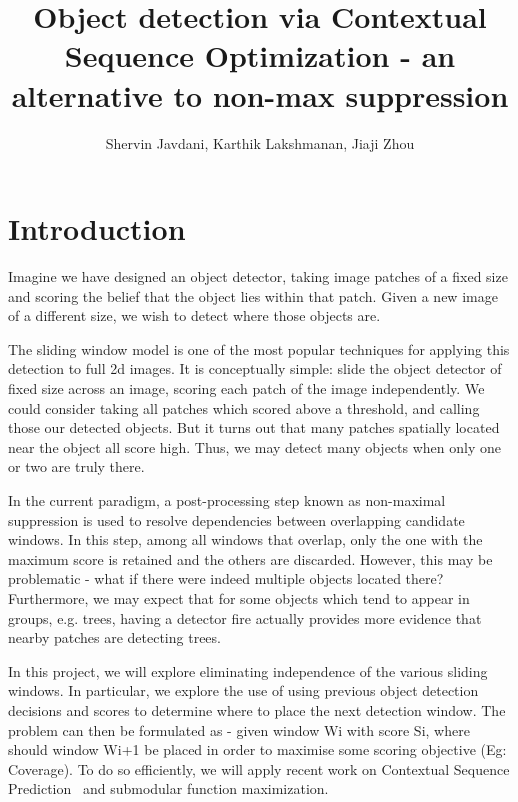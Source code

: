 \documentclass[11pt]{article}
\title{ \bf
Object detection via Contextual Sequence Optimization - an alternative to non-max suppression
}
\date{}
\author{Shervin Javdani, Karthik Lakshmanan, Jiaji Zhou}
\begin{document}
\maketitle



\section{Introduction}
Imagine we have designed an object detector, taking image patches of a fixed size and scoring the belief that the object lies within that patch. Given a new image of a different size, we wish to detect where those objects are.

The sliding window model is one of the most popular techniques for applying this detection to full 2d images. It is conceptually simple: slide the object detector of fixed size across an image, scoring each patch of the image independently. We could consider taking all patches which scored above a threshold, and calling those our detected objects. But it turns out that many patches spatially located near the object all score high. Thus, we may detect many objects when only one or two are truly there.

In the current paradigm, a post-processing step known as non-maximal suppression is used to resolve dependencies between overlapping candidate windows. In this step, among all windows that overlap, only the one with the maximum score is retained and the others are discarded. However, this may be problematic - what if there were indeed multiple objects located there? Furthermore, we may expect that for some objects which tend to appear in groups, e.g. trees, having a detector fire actually provides more evidence that nearby patches are detecting trees.

In this project, we will explore eliminating independence of the various sliding windows. In particular, we explore the use of using previous object detection decisions and scores to determine where to place the next detection window. The problem can then be formulated as - given window Wi with score Si, where should window Wi+1 be placed in order to maximise some scoring objective (Eg: Coverage). To do so efficiently, we will apply recent work on Contextual Sequence Prediction~\cite{dey_2012_conseqopt} and submodular function maximization.




\end{document}

